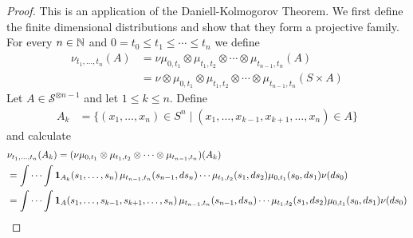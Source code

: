 \begin{proof}
This is an application of the Daniell-Kolmogorov Theorem.  We first
define the finite dimensional distributions and show that they form a
projective family.  For every $n \in \mathbb{N}$ and $0 =t_0 \leq t_1 \leq
\dotsb \leq t_n$ we define
\begin{align*}
\nu_{t_1, \dotsc, t_n}(A) 
&= \nu \mu_{0,t_1} \otimes \mu_{t_1, t_2} \otimes \dotsb \otimes \mu_{t_{n-1}, t_n}(A) \\
&=\nu \otimes \mu_{0,t_1} \otimes \mu_{t_1, t_2} \otimes \dotsb \otimes \mu_{t_{n-1}, t_n}(S \times A) 
\end{align*}
Let $A \in \mathcal{S}^{\otimes n-1}$ and let $1 \leq k \leq n$.
Define
\begin{align*}
A_k &= \lbrace (x_1, \dotsc, x_n) \in S^n \mid (x_1, \dotsc, x_{k-1},
x_{k+1}, \dotsc, x_n) \in A \rbrace
\end{align*}
and calculate
\begin{align*}
&\nu_{t_1, \dotsc, t_n}(A_k) = ( \nu \mu_{0,t_1} \otimes \mu_{t_1, t_2}
\otimes \dotsb \otimes \mu_{t_{n-1}, t_n})(A_k) \\
&=\idotsint \textbf{1}_{A_k}(s_1, \dotsc, s_n) \, 
\mu_{t_{n-1},t_n}(s_{n-1}, ds_n) \dotsb \mu_{t_1, t_2}(s_1, ds_2) \mu_{0,t_1}(s_0, ds_1) \nu(ds_0)\\
&=\idotsint\textbf{1}_{A}(s_1,  \dotsc, s_{k-1}, s_{k+1}, \dotsc, s_n) \,
\mu_{t_{n-1},t_n}(s_{n-1}, ds_n) \dotsb \mu_{t_1,  t_2}(s_1, ds_2) \mu_{0, t_1}(s_0, ds_1) \nu(ds_0)
\end{align*}


\end{proof}
